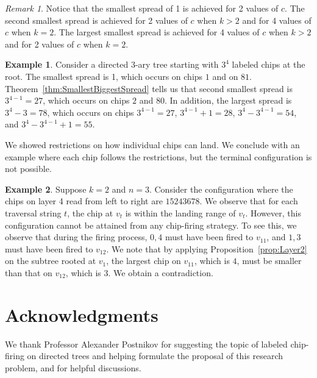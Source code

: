 \documentclass[11pt]{article}
\theoremstyle{definition}
\newtheorem{example}{Example}
\theoremstyle{remark}
\newtheorem*{remark}{Remark} %
\begin{document}
\begin{remark}
    Notice that the smallest spread of 1 is achieved for 2 values of $c$. The second smallest spread is achieved for 2 values of $c$ when $k > 2$ and for 4 values of $c$ when $k=2$. The largest smallest spread is achieved for 4 values of $c$ when $k > 2$ and for 2 values of $c$ when $k = 2$.
\end{remark}

\begin{example}
Consider a directed $3$-ary tree starting with $3^4$ labeled chips at the root. The smallest spread is 1, which occurs on chips $1$ and on $81$. Theorem~\ref{thm:SmallestBiggestSpread} tells us that second smallest spread is $3^{4-1}=27$, which occurs on chips $2$ and 80. In addition, the largest spread is $3^{4}-3=78$, which occurs on chips $3^{4-1}=27$, $3^{4-1}+1=28$, $3^4 - 3^{4-1}=54$, and $3^4 - 3^{4-1} + 1 =55$. %
\end{example}

We showed restrictions on how individual chips can land. We conclude with an example where each chip follows the restrictions, but the terminal configuration is not possible.

\begin{example}
    Suppose $k=2$ and $n=3$. Consider the configuration where the chips on layer 4 read from left to right are $15243678$. We observe that for each traversal string $t$, the chip at $v_t$ is within the landing range of $v_t$. However, this configuration cannot be attained from any chip-firing strategy. To see this, we observe that during the firing process, $0, 4$ must have been fired to $v_{11}$, and $1, 3$ must have been fired to $v_{12}$. We note that by applying Proposition~\ref{prop:Layer2} on the subtree rooted at $v_1$, the largest chip on $v_{11}$, which is $4$, must be smaller than that on $v_{12}$, which is $3$. We obtain a contradiction.
\end{example}

\section{Acknowledgments} 

We thank Professor Alexander Postnikov for suggesting the topic of labeled chip-firing on directed trees and helping formulate the proposal of this research problem, and for helpful discussions.
\end{document}
